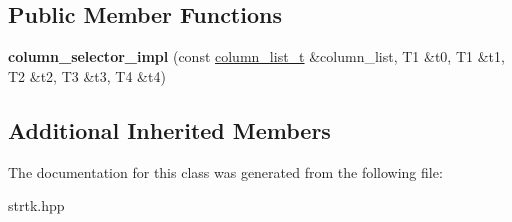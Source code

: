 \subsection*{Public Member Functions}
\begin{DoxyCompactItemize}
\item 
\hypertarget{classstrtk_1_1details_1_1column__selector__impl_3_01T0_00_01T1_00_01T2_00_01T3_00_01T4_01_4_a684b6909266a8c592b026b1c3fe01d7a}{{\bfseries column\-\_\-selector\-\_\-impl} (const \hyperlink{structstrtk_1_1details_1_1column__list__impl}{column\-\_\-list\-\_\-t} \&column\-\_\-list, T1 \&t0, T1 \&t1, T2 \&t2, T3 \&t3, T4 \&t4)}\label{classstrtk_1_1details_1_1column__selector__impl_3_01T0_00_01T1_00_01T2_00_01T3_00_01T4_01_4_a684b6909266a8c592b026b1c3fe01d7a}

\end{DoxyCompactItemize}
\subsection*{Additional Inherited Members}


The documentation for this class was generated from the following file\-:\begin{DoxyCompactItemize}
\item 
strtk.\-hpp\end{DoxyCompactItemize}
